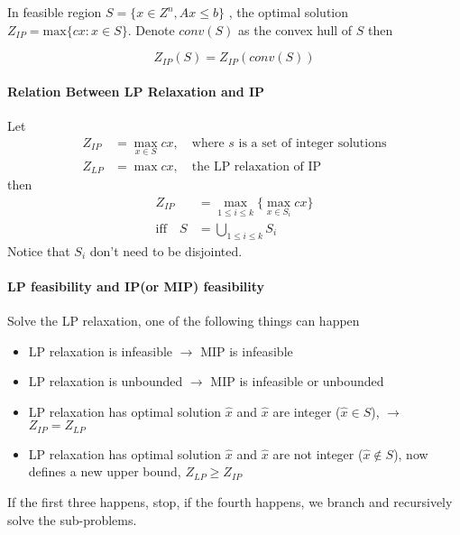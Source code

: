                     In feasible region $S = \{x\in Z^n, Ax\le b\}$ , the optimal solution $Z_{IP} = \text{max}\{cx: x\in S\}$. Denote $conv(S)$ as the convex hull of $S$ then

                    \begin{equation*}Z_{IP}(S) = Z_{IP}(conv(S))  \end{equation*}
            
                \paragraph{Relation Between LP Relaxation and IP}
                    Let
                    \begin{align*}
                        Z_{IP} &=\max_{x\in S} cx, \quad \text{where } s \text{ is a set of integer solutions} \\
                        Z_{LP} &=\max cx, \quad \text{the LP relaxation of IP}  
                    \end{align*}
                    then
                    \begin{align*}
                        Z_{IP} &= \max_{1\le i \le k} \{\max_{x \in S_i} cx \} \\
                        \text{iff} \quad S&=\bigcup_{1\le i \le k} S_i 
                    \end{align*}
                    Notice that $S_i$ don\rq{}t need to be disjointed.
                    
                \paragraph{LP feasibility and IP(or MIP) feasibility}
                    Solve the LP relaxation, one of the following things can happen
                    \begin{itemize}
                        \item LP relaxation is infeasible $\rightarrow$ MIP is infeasible
                        \item LP relaxation is unbounded $\rightarrow$ MIP is infeasible or unbounded
                        \item LP relaxation has optimal solution $\hat{x}$ and $\hat{x}$ are integer ($\hat{x} \in S$), $\rightarrow$ $Z_{IP} = Z_{LP}$
                        \item LP relaxation has optimal solution $\hat{x}$ and $\hat{x}$ are not integer ($\hat{x} \notin S$), now defines a new upper bound, $Z_{LP} \ge Z_{IP}$                    
                    \end{itemize}
                    If the first three happens, stop, if the fourth happens, we branch and recursively solve the sub-problems.

